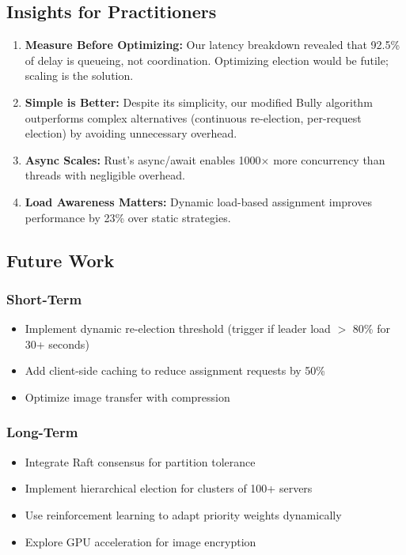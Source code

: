 \documentclass[12pt,a4paper]{article}
\begin{document}
\subsection{Insights for Practitioners}

\begin{enumerate}
    \item \textbf{Measure Before Optimizing:} Our latency breakdown revealed that 92.5\% of delay is queueing, not coordination. Optimizing election would be futile; scaling is the solution.

    \item \textbf{Simple is Better:} Despite its simplicity, our modified Bully algorithm outperforms complex alternatives (continuous re-election, per-request election) by avoiding unnecessary overhead.

    \item \textbf{Async Scales:} Rust's async/await enables 1000$\times$ more concurrency than threads with negligible overhead.

    \item \textbf{Load Awareness Matters:} Dynamic load-based assignment improves performance by 23\% over static strategies.
\end{enumerate}

\subsection{Future Work}

\subsubsection{Short-Term}

\begin{itemize}
    \item Implement dynamic re-election threshold (trigger if leader load $>$ 80\% for 30+ seconds)
    \item Add client-side caching to reduce assignment requests by 50\%
    \item Optimize image transfer with compression
\end{itemize}

\subsubsection{Long-Term}

\begin{itemize}
    \item Integrate Raft consensus for partition tolerance
    \item Implement hierarchical election for clusters of 100+ servers
    \item Use reinforcement learning to adapt priority weights dynamically
    \item Explore GPU acceleration for image encryption
\end{itemize}
\end{document}
